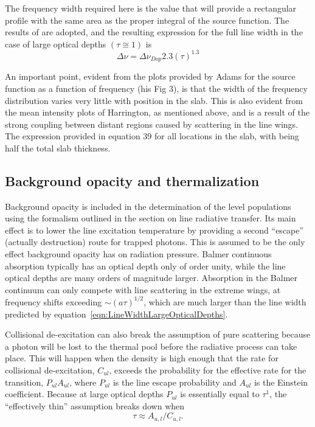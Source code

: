 The frequency width required here is the value that will provide a
rectangular profile with the same area as the proper integral of the source
function.  The results of \citet{Adams1972} are adopted, and the resulting
expression for the full line width in the case of large optical depths
$(\tau
\cong 1)$ is
\begin{equation}
\label{eqn:LineWidthLargeOpticalDepths}
\Delta \nu = \Delta \nu_{Dop} 2.3 (\tau)^{1.3}
\end{equation}

An important point, evident from the plots provided by Adams for the
source function as a function of frequency (his Fig 3), is that the width
of the frequency distribution varies very little with position in the slab.
This is also evident from the mean intensity plots of Harrington, as
mentioned above, and is a result of the strong coupling between distant
regions caused by scattering in the line wings.  The expression provided
in equation 39 for all locations in the slab, with  being half the total
slab thickness.

\subsection{Background opacity and thermalization}

Background opacity is included in the determination of the level
populations using the formalism outlined in the section on line radiative
transfer.  Its main effect is to lower the line excitation temperature by
providing a second ``escape'' (actually destruction) route for trapped
photons.  This is assumed to be the only effect background opacity has on
radiation pressure.  Balmer continuous absorption typically has an optical
depth only of order unity, while the line optical depths are many orders
of magnitude larger.  Absorption in the Balmer continuum can only compete
with line scattering in the extreme wings, at frequency shifts exceeding
$ \sim {\left( {a\tau } \right)^{1/2}}$, which are much larger than the
line width predicted by equation~\ref{eqn:LineWidthLargeOpticalDepths}.

Collisional de-excitation can also break the assumption of pure scattering
because a photon will be lost to the thermal pool before the radiative
process can take place.  This will happen when the density is high enough
that the rate for collisional de-excitation, $C_{ul}$, exceeds the probability
for the effective rate for the transition, $P_{ul} A_{ul}$, where $P_{ul}$ is the line
escape probability and $A_{ul}$ is the Einstein coefficient.  Because at large
optical depths $P_{ul}$ is essentially equal to $\tau^1$,
the ``effectively thin''
assumption breaks down when
\begin{equation}
\tau  \approx {A_{u,l}}/{C_{u,l}}.
\end{equation}

